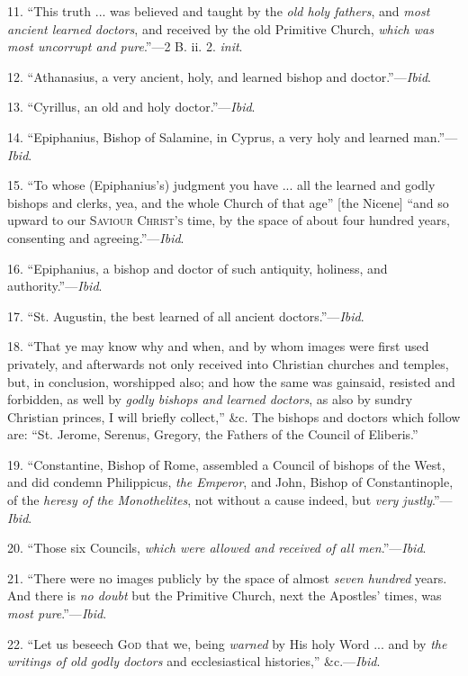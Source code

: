11. ``This truth ... was believed and taught by the \emph{old holy
fathers}, and \emph{most ancient learned doctors}, and received by
the old Primitive Church, \emph{which was most uncorrupt and pure}.''—2
B. ii. 2. \emph{init}.

12. ``Athanasius, a very ancient, holy, and learned bishop and
doctor.''—\emph{Ibid}.

13. ``Cyrillus, an old and holy doctor.''—\emph{Ibid}.

14. ``Epiphanius, Bishop of Salamine, in Cyprus, a very holy
and learned man.''—\emph{Ibid}.

15. ``To whose (Epiphanius's) judgment you have ... all the
learned and godly bishops and clerks, yea, and the whole Church of
that age'' [the Nicene] ``and so upward to our S\textsc{aviour}
C\textsc{hrist's} time, by the space of about four
hundred years, consenting and agreeing.''—\emph{Ibid}.

16. ``Epiphanius, a bishop and doctor of such antiquity,
holiness, and authority.''—\emph{Ibid}.

17. ``St. Augustin, the best learned of all ancient
doctors.''—\emph{Ibid}.

18. ``That ye may know why and when, and by whom images were
first used privately, and afterwards not only received into Christian
churches and temples, but, in conclusion, worshipped also; and how the
same was gainsaid, resisted and forbidden, as well by \emph{godly bishops
and learned doctors}, as also by sundry Christian princes, I will
briefly collect,'' \&c. The bishops and doctors which follow
are: ``St. Jerome, Serenus, Gregory, the Fathers of the Council of
Eliberis.''

19. ``Constantine, Bishop of Rome, assembled a Council of
bishops of the West, and did condemn Philippicus, \emph{the Emperor},
and John, Bishop of Constantinople, of the \emph{heresy of the
Monothelites}, not without a cause indeed, but \emph{very justly}.''—\emph{Ibid}.

20. ``Those six Councils, \emph{which were allowed and received of
all men}.''—\emph{Ibid}.

21. ``There were no images publicly by the space of almost \emph{seven
hundred} years. And there is \emph{no doubt} but the Primitive
Church, next the Apostles' times, was \emph{most pure}.''—\emph{Ibid}.

22. ``Let us beseech G\textsc{od} that we, being \emph{warned}
by His holy Word ... and by \emph{the writings of old godly doctors}
and ecclesiastical histories,'' \&c.—\emph{Ibid}.

